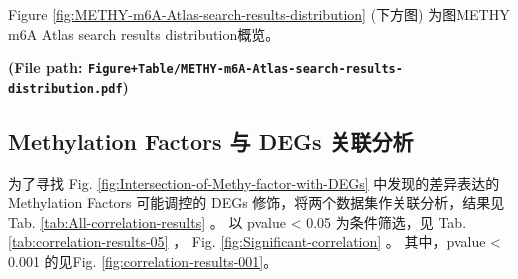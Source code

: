 \documentclass[
]{article}
\begin{document}
Figure \ref{fig:METHY-m6A-Atlas-search-results-distribution} (下方图) 为图METHY m6A Atlas search results distribution概览。

\textbf{(File path: \texttt{Figure+Table/METHY-m6A-Atlas-search-results-distribution.pdf})}

\begin{center}\vspace{1.5cm}\end{center}

\hypertarget{methylation-factors-ux4e0e-degs-ux5173ux8054ux5206ux6790}{%
\subsection{Methylation Factors 与 DEGs 关联分析}\label{methylation-factors-ux4e0e-degs-ux5173ux8054ux5206ux6790}}

为了寻找 Fig. \ref{fig:Intersection-of-Methy-factor-with-DEGs} 中发现的差异表达的 Methylation Factors
可能调控的 DEGs 修饰，将两个数据集作关联分析，结果见 Tab. \ref{tab:All-correlation-results} 。
以 pvalue \textless{} 0.05 为条件筛选，见 Tab. \ref{tab:correlation-results-05} ，
Fig. \ref{fig:Significant-correlation} 。
其中，pvalue \textless{} 0.001 的见Fig. \ref{fig:correlation-results-001}。

\begin{center}\vspace{1.5cm}\end{center}
\end{document}
